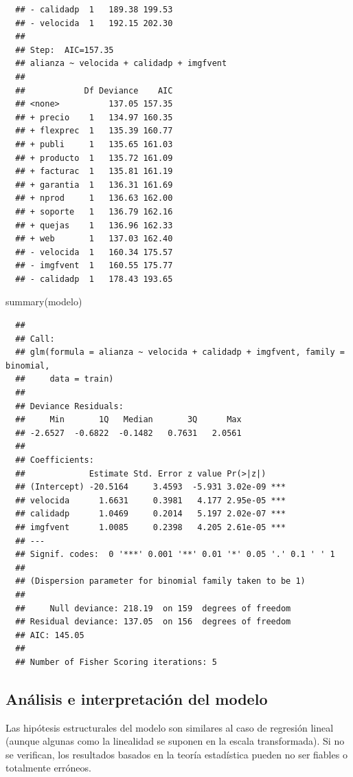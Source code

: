 \documentclass[
]{book}
\newenvironment{Shaded}{\begin{snugshade}}{\end{snugshade}}
\newcommand{\FunctionTok}[1]{\textcolor[rgb]{0.00,0.00,0.00}{#1}}
\newcommand{\NormalTok}[1]{#1}
\theoremstyle{break}
\theoremstyle{nonumberplain}
\begin{document}
\begin{verbatim}
  ## - calidadp  1   189.38 199.53
  ## - velocida  1   192.15 202.30
  ## 
  ## Step:  AIC=157.35
  ## alianza ~ velocida + calidadp + imgfvent
  ## 
  ##            Df Deviance    AIC
  ## <none>          137.05 157.35
  ## + precio    1   134.97 160.35
  ## + flexprec  1   135.39 160.77
  ## + publi     1   135.65 161.03
  ## + producto  1   135.72 161.09
  ## + facturac  1   135.81 161.19
  ## + garantia  1   136.31 161.69
  ## + nprod     1   136.63 162.00
  ## + soporte   1   136.79 162.16
  ## + quejas    1   136.96 162.33
  ## + web       1   137.03 162.40
  ## - velocida  1   160.34 175.57
  ## - imgfvent  1   160.55 175.77
  ## - calidadp  1   178.43 193.65
\end{verbatim}

\begin{Shaded}
\begin{Highlighting}[]
\FunctionTok{summary}\NormalTok{(modelo)}
\end{Highlighting}
\end{Shaded}

\begin{verbatim}
  ## 
  ## Call:
  ## glm(formula = alianza ~ velocida + calidadp + imgfvent, family = binomial, 
  ##     data = train)
  ## 
  ## Deviance Residuals: 
  ##     Min       1Q   Median       3Q      Max  
  ## -2.6527  -0.6822  -0.1482   0.7631   2.0561  
  ## 
  ## Coefficients:
  ##             Estimate Std. Error z value Pr(>|z|)    
  ## (Intercept) -20.5164     3.4593  -5.931 3.02e-09 ***
  ## velocida      1.6631     0.3981   4.177 2.95e-05 ***
  ## calidadp      1.0469     0.2014   5.197 2.02e-07 ***
  ## imgfvent      1.0085     0.2398   4.205 2.61e-05 ***
  ## ---
  ## Signif. codes:  0 '***' 0.001 '**' 0.01 '*' 0.05 '.' 0.1 ' ' 1
  ## 
  ## (Dispersion parameter for binomial family taken to be 1)
  ## 
  ##     Null deviance: 218.19  on 159  degrees of freedom
  ## Residual deviance: 137.05  on 156  degrees of freedom
  ## AIC: 145.05
  ## 
  ## Number of Fisher Scoring iterations: 5
\end{verbatim}

\hypertarget{analisis-glm}{%
\subsection{Análisis e interpretación del modelo}\label{analisis-glm}}

Las hipótesis estructurales del modelo son similares al caso de regresión lineal (aunque algunas como la linealidad se suponen en la escala transformada).
Si no se verifican, los resultados basados en la teoría estadística pueden no ser fiables o totalmente erróneos.
\end{document}
